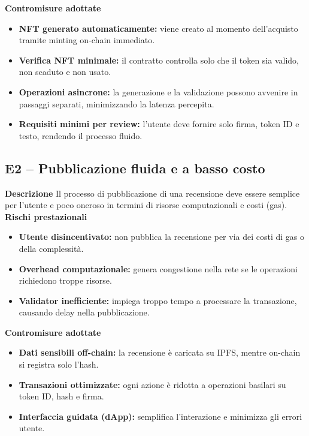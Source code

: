             \noindent \textbf{Contromisure adottate}
                \begin{itemize}
                    \item \textbf{NFT generato automaticamente:} viene creato al momento dell'acquisto tramite minting on-chain immediato.

                    \item \textbf{Verifica NFT minimale:} il contratto controlla solo che il token sia valido, non scaduto e non usato.

                    \item \textbf{Operazioni asincrone:} la generazione e la validazione possono avvenire in passaggi separati, minimizzando la latenza percepita.

                    \item \textbf{Requisiti minimi per review:} l'utente deve fornire solo firma, token ID e testo, rendendo il processo fluido.
                \end{itemize}

        \subsection{E2 – Pubblicazione fluida e a basso costo}
            \noindent \textbf{Descrizione}
                Il processo di pubblicazione di una recensione deve essere semplice per l'utente e poco oneroso in termini di risorse computazionali e costi (gas). \\

            \noindent \textbf{Rischi prestazionali}
                \begin{itemize}
                    \item \textbf{Utente disincentivato:} non pubblica la recensione per via dei costi di gas o della complessità.

                    \item \textbf{Overhead computazionale:} genera congestione nella rete se le operazioni richiedono troppe risorse.

                    \item \textbf{Validator inefficiente:} impiega troppo tempo a processare la transazione, causando delay nella pubblicazione.
                \end{itemize}

            \noindent \textbf{Contromisure adottate}
                \begin{itemize}
                    \item \textbf{Dati sensibili off-chain:} la recensione è caricata su IPFS, mentre on-chain si registra solo l’hash.

                    \item \textbf{Transazioni ottimizzate:} ogni azione è ridotta a operazioni basilari su token ID, hash e firma.

                    \item \textbf{Interfaccia guidata (dApp):} semplifica l'interazione e minimizza gli errori utente.
                \end{itemize}

